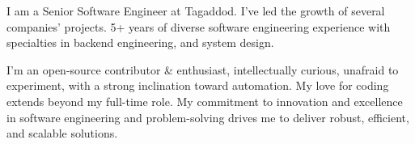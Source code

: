 

\begin{cvparagraph}

I am a Senior Software Engineer at Tagaddod. I've led the growth of several companies' projects. 5+ years of diverse software engineering experience with specialties in backend engineering, and system design.

I'm an open-source contributor & enthusiast, intellectually curious, unafraid to experiment, with a strong inclination toward automation. My love for coding extends beyond my full-time role. My commitment to innovation and excellence in software engineering and problem-solving drives me to deliver robust, efficient, and scalable solutions.
\end{cvparagraph}
